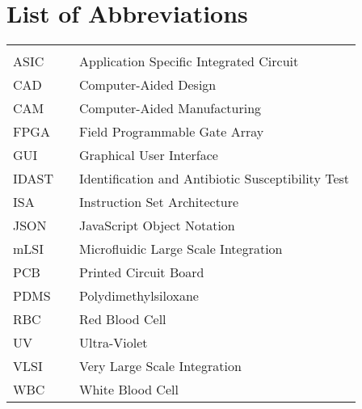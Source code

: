 \chapter*{List of Abbreviations}
\begin{center}
  \begin{tabular}{lll}
    \hspace*{2em} & \hspace*{1in} & \hspace*{4.5in} \\
    ASIC & \dotfill & Application Specific Integrated Circuit \\
    CAD  & \dotfill & Computer-Aided Design \\
    CAM  & \dotfill & Computer-Aided Manufacturing \\
    FPGA & \dotfill & Field Programmable Gate Array \\
    GUI  & \dotfill & Graphical User Interface \\
    IDAST &\dotfill & Identification and Antibiotic Susceptibility Test\\
    ISA	 & \dotfill & Instruction Set Architecture \\
    JSON & \dotfill & JavaScript Object Notation \\
    mLSI & \dotfill & Microfluidic Large Scale Integration \\
    PCB  & \dotfill & Printed Circuit Board \\
    PDMS & \dotfill & Polydimethylsiloxane \\
    RBC  & \dotfill & Red Blood Cell \\
    UV	 & \dotfill & Ultra-Violet \\
    VLSI & \dotfill & Very Large Scale Integration \\
    WBC  & \dotfill & White Blood Cell \\
  \end{tabular}
\end{center}
\cleardoublepage


\newpage
\endofprelim
